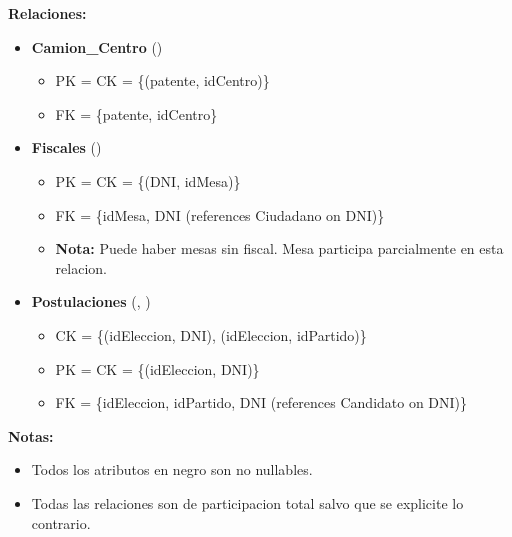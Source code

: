 \vspace{2mm}
\textbf{Relaciones:}
\vspace{1mm}

\begin{itemize}
	
	\item \textbf{Camion\_Centro} () 
	\begin{itemize}
		\item PK = CK = \{(patente, idCentro)\}
		\item FK = \{patente, idCentro\}
	\end{itemize}
	\vspace{1mm}

	\item \textbf{Fiscales} () 
	\begin{itemize}
		\item PK = CK = \{(DNI, idMesa)\}
		\item FK = \{idMesa, DNI  (references Ciudadano on DNI)\}
		\item \textbf{Nota:} Puede haber mesas sin fiscal. Mesa participa parcialmente en esta relacion.
	\end{itemize}
	\vspace{1mm}

	\item \textbf{Postulaciones} (, ) 
	\begin{itemize}
		\item CK = \{(idEleccion, DNI), (idEleccion, idPartido)\}
		\item PK = CK = \{(idEleccion, DNI)\}
		\item FK = \{idEleccion, idPartido, DNI  (references Candidato on DNI)\}
	\end{itemize}
	\vspace{1mm}

\end{itemize}

\textbf{Notas:} 
\begin{itemize}
	\item Todos los atributos en negro son no nullables.
	\item Todas las relaciones son de participacion total salvo que se explicite lo contrario.
\end{itemize}
